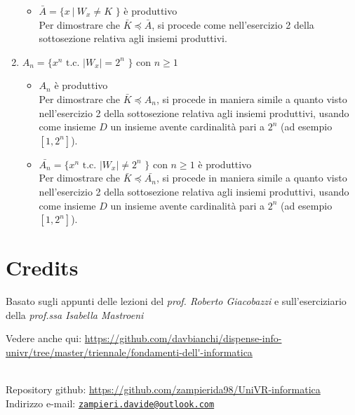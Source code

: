 \documentclass[a4paper,oneside,titlepage]{book}
\newcommand{\mail}[1]{\href{mailto:#1}{\texttt{#1}}}
\begin{document}
\begin{enumerate}[label=\fbox{\arabic*}]
\begin{itemize}
\item $\bar{A} = \text{\{ } x \ | \ W_x \neq K \text{ \}}$ è produttivo
\\ Per dimostrare che $\bar{K} \preceq \bar{A}$, si procede come nell'esercizio 2 della sottosezione relativa agli insiemi produttivi.
\end{itemize}

\item $A_n = \text{\{ } x^n \text{ t.c. } |W_x| = 2^n \text{ \}}$ con $n \geq 1$
\begin{itemize}
\item $A_n$ è produttivo
\\ Per dimostrare che $\bar{K} \preceq A_n$, si procede in maniera simile a quanto visto nell'esercizio 2 della sottosezione relativa agli insiemi produttivi, usando come insieme $D$ un insieme avente cardinalità pari a $2^n$ (ad esempio $[1,2^n]$).

\item $\bar{A_n} = \text{\{ } x^n \text{ t.c. } |W_x| \neq 2^n \text{ \}}$ con $n \geq 1$ è produttivo
\\ Per dimostrare che $\bar{K} \preceq \bar{A_n}$, si procede in maniera simile a quanto visto nell'esercizio 2 della sottosezione relativa agli insiemi produttivi, usando come insieme $D$ un insieme avente cardinalità pari a $2^n$ (ad esempio $[1,2^n]$).
\end{itemize}


\end{enumerate}


\backmatter
\chapter{Credits}
Basato sugli appunti delle lezioni del \textit{prof. Roberto Giacobazzi} e sull'eserciziario della \textit{prof.ssa Isabella Mastroeni}

\noindent
Vedere anche qui: \url{https://github.com/davbianchi/dispense-info-univr/tree/master/triennale/fondamenti-dell'-informatica}

\noindent
\\
Repository github: \url{https://github.com/zampierida98/UniVR-informatica} \\
Indirizzo e-mail: \mail{zampieri.davide@outlook.com}
\end{document}
